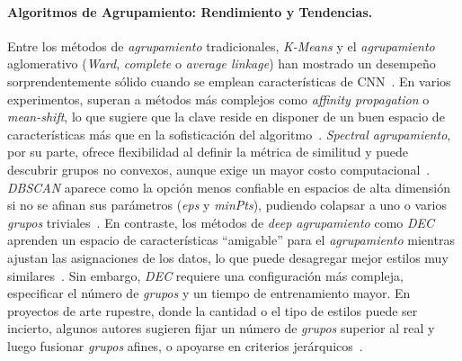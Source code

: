 \paragraph{Algoritmos de Agrupamiento: Rendimiento y Tendencias.}
Entre los métodos de \textit{agrupamiento} tradicionales, \textit{K-Means} y el \textit{agrupamiento} aglomerativo (\textit{Ward}, \textit{complete} o \textit{average linkage}) han mostrado un desempeño sorprendentemente sólido cuando se emplean características de CNN~\cite{gairola2020,guerin2018}.
En varios experimentos, superan a métodos más complejos como \textit{affinity propagation} o \textit{mean-shift}, lo que sugiere que la clave reside en disponer de un buen espacio de características más que en la sofisticación del algoritmo~\cite{dangeti2024}.
\textit{Spectral agrupamiento}, por su parte, ofrece flexibilidad al definir la métrica de similitud y puede descubrir grupos no convexos, aunque exige un mayor costo computacional~\cite{gultepe2018}.
\textit{DBSCAN} aparece como la opción menos confiable en espacios de alta dimensión si no se afinan sus parámetros (\textit{eps} y \textit{minPts}), pudiendo colapsar a uno o varios \textit{grupos} triviales~\cite{dangeti2024}.
En contraste, los métodos de \textit{deep agrupamiento} como \textit{DEC} aprenden un espacio de características “amigable” para el \textit{agrupamiento} mientras ajustan las asignaciones de los datos, lo que puede desagregar mejor estilos muy similares~\cite{castellano2022}.
Sin embargo, \textit{DEC} requiere una configuración más compleja, especificar el número de \textit{grupos} y un tiempo de entrenamiento mayor.
En proyectos de arte rupestre, donde la cantidad o el tipo de estilos puede ser incierto, algunos autores sugieren fijar un número de \textit{grupos} superior al real y luego fusionar \textit{grupos} afines, o apoyarse en criterios jerárquicos~\cite{dangeti2024}.

